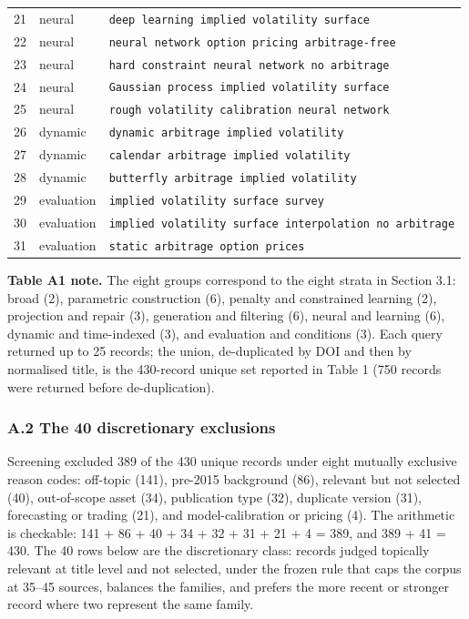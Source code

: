 \documentclass[11pt]{article}
\begin{document}
\begin{longtable}{@{}p{}p{}p{}@{}}
21 & neural & \texttt{deep learning implied volatility surface} \\
22 & neural & \texttt{neural network option pricing arbitrage-free} \\
23 & neural & \texttt{hard constraint neural network no arbitrage} \\
24 & neural & \texttt{Gaussian process implied volatility surface} \\
25 & neural & \texttt{rough volatility calibration neural network} \\
26 & dynamic & \texttt{dynamic arbitrage implied volatility} \\
27 & dynamic & \texttt{calendar arbitrage implied volatility} \\
28 & dynamic & \texttt{butterfly arbitrage implied volatility} \\
29 & evaluation & \texttt{implied volatility surface survey} \\
30 & evaluation & \texttt{implied volatility surface interpolation no arbitrage} \\
31 & evaluation & \texttt{static arbitrage option prices} \\
\bottomrule
\end{longtable}
\endgroup

\textbf{Table A1 note.} The eight groups correspond to the eight strata in Section 3.1: broad (2), parametric construction (6), penalty and constrained learning (2), projection and repair (3), generation and filtering (6), neural and learning (6), dynamic and time-indexed (3), and evaluation and conditions (3). Each query returned up to 25 records; the union, de-duplicated by DOI and then by normalised title, is the 430-record unique set reported in Table 1 (750 records were returned before de-duplication).

\subsubsection*{A.2 The 40 discretionary exclusions}
Screening excluded 389 of the 430 unique records under eight mutually exclusive reason codes: off-topic (141), pre-2015 background (86), relevant but not selected (40), out-of-scope asset (34), publication type (32), duplicate version (31), forecasting or trading (21), and model-calibration or pricing (4). The arithmetic is checkable: 141 + 86 + 40 + 34 + 32 + 31 + 21 + 4 = 389, and 389 + 41 = 430. The 40 rows below are the discretionary class: records judged topically relevant at title level and not selected, under the frozen rule that caps the corpus at 35–45 sources, balances the families, and prefers the more recent or stronger record where two represent the same family.
\end{document}
